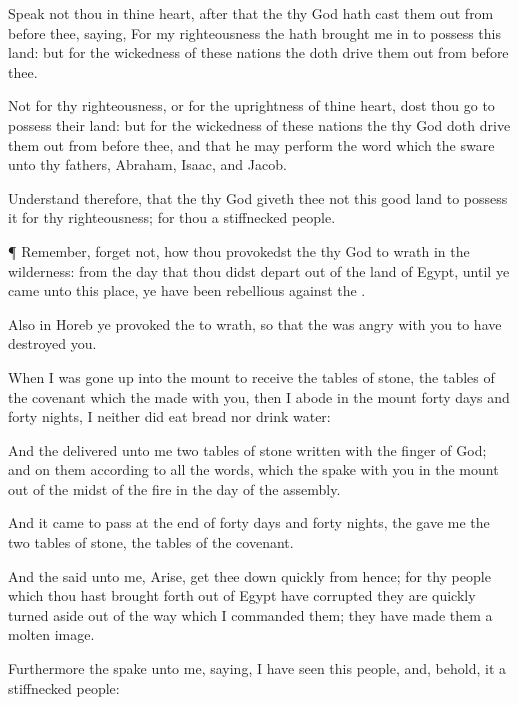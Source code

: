 {Speak not thou in thine
heart, after that the
{} thy
God hath cast them
out from
before thee,
saying, For my
righteousness the
{} hath brought me
in to
possess this
land: but for the
wickedness of these
nations the
{} doth drive them
out from
before thee.

Not for thy
righteousness, or for the
uprightness of thine
heart, dost thou
go to
possess their
land: but for the
wickedness of these
nations the
{} thy
God doth drive them
out from
before thee, and that he may
perform the
word which the
{}
sware unto thy
fathers,
Abraham,
Isaac, and
Jacob.

Understand therefore, that the
{} thy
God
giveth thee not this
good
land to
possess it for thy
righteousness; for thou
{} a
stiffnecked
people.


\par }{\PP {}¶
Remember,
{}
forget not, how thou provokedst the
{} thy
God to
wrath in the
wilderness:
from the
day that thou didst depart
out of the
land of
Egypt, until ye
came unto this
place, ye have been
rebellious
against the
{}.

Also in
Horeb ye
provoked the
{} to
wrath, so that the
{} was
angry with you to have
destroyed you.

When I was gone
up into the
mount to
receive the
tables of
stone,
{} the
tables of the
covenant which the
{}
made with you, then I
abode in the
mount
forty
days and
forty
nights, I neither did
eat
bread nor
drink
water:

And the
{}
delivered unto me
two
tables of
stone
written with the
finger of
God; and on them
{} according to all the
words, which the
{}
spake with you in the
mount out of the
midst of the
fire in the
day of the
assembly.

And it came to pass at the
end of
forty
days and
forty
nights,
{} the
{}
gave me the
two
tables of
stone,
{} the
tables of the
covenant.

And the
{}
said unto me,
Arise, get thee
down
quickly from hence; for thy
people which thou hast brought
forth out of
Egypt have
corrupted
{} they are
quickly turned
aside out of the
way which I
commanded them; they have
made them a molten
image.

Furthermore the
{}
spake unto me,
saying, I have
seen this
people, and, behold, it
{} a
stiffnecked
people:

}
